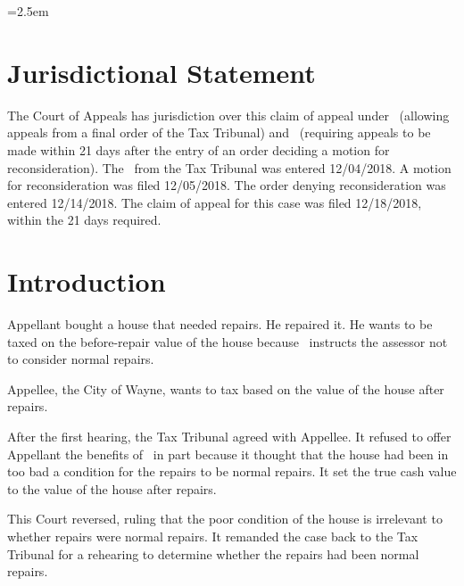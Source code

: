\documentclass[12pt,\documentclassflag]{michiganCourtOfAppealsBrief}
\begin{document}
\tableofauthorities

\pagestyle{plain}



\parindent=2.5em
\doublespacing

\section{Jurisdictional Statement}
 
The Court of Appeals has jurisdiction over this claim of appeal under \cite{MCL 205.753(2)}\ (allowing appeals from a final order of the Tax Tribunal) and \cite{MCR 7.204(A)(1)(b)}\ (requiring appeals to be made within 21 days after the entry of an order deciding a motion for reconsideration). The \FOJ\ from the Tax Tribunal was entered 12/04/2018. A motion for reconsideration was filed 12/05/2018. The order denying reconsideration was entered 12/14/2018. The claim of appeal for this case was filed 12/18/2018, within the 21 days required.

\section{Introduction}

Appellant bought a house that needed repairs. He repaired it. He wants to be taxed on the before-repair value of the house because  \mathieuGast\ instructs the assessor not to consider normal repairs. 

Appellee, the City of Wayne, wants to tax based on the value of the house after repairs.

After the first hearing, the Tax Tribunal agreed with Appellee. It refused to offer Appellant the benefits of \mathieuGast\ in part because it thought that the house had been in too bad a condition for the repairs to be normal repairs. It set the true cash value to the value of the house after repairs.

This Court reversed, ruling that the poor condition of the house is irrelevant to whether repairs were normal repairs. It remanded the case back to the Tax Tribunal for a rehearing to determine whether the repairs had been normal repairs. 
\end{document}
